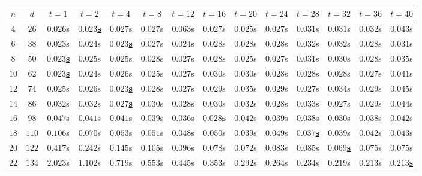 \begin{table}
    \centering
    {\renewcommand{\arraystretch}{1.15}
        \setlength{\tabcolsep}{2.5pt}
        \begin{tabular}{cccccccccccccc}
            $n$ & $d$ & $t = 1$ & $t = 2$ & $t = 4$ & $t = 8$ & $t = 12$ & $t = 16$ & $t = 20$ & $t = 24$ & $t = 28$ & $t = 32$ & $t = 36$ & $t = 40$ \\
            \hline
            $4$ & $26$ & $0.026$s & \underline{$\mathbf{0.023}$\textbf{s}} & $0.027$s & $0.027$s & $0.063$s & $0.027$s & $0.025$s & $0.027$s & $0.031$s & $0.031$s & $0.032$s & $0.043$s \\
            $6$ & $38$ & $0.023$s & $0.024$s & \underline{$\mathbf{0.023}$\textbf{s}} & $0.027$s & $0.024$s & $0.028$s & $0.028$s & $0.028$s & $0.032$s & $0.032$s & $0.028$s & $0.031$s \\
            $8$ & $50$ & \underline{$\mathbf{0.023}$\textbf{s}} & $0.025$s & $0.025$s & $0.028$s & $0.027$s & $0.028$s & $0.025$s & $0.027$s & $0.031$s & $0.030$s & $0.028$s & $0.035$s \\
            $10$ & $62$ & \underline{$\mathbf{0.023}$\textbf{s}} & $0.024$s & $0.026$s & $0.025$s & $0.027$s & $0.030$s & $0.030$s & $0.028$s & $0.028$s & $0.028$s & $0.027$s & $0.041$s \\
            $12$ & $74$ & $0.025$s & $0.026$s & \underline{$\mathbf{0.023}$\textbf{s}} & $0.028$s & $0.027$s & $0.029$s & $0.035$s & $0.029$s & $0.027$s & $0.034$s & $0.029$s & $0.045$s \\
            $14$ & $86$ & $0.032$s & $0.032$s & \underline{$\mathbf{0.027}$\textbf{s}} & $0.030$s & $0.028$s & $0.030$s & $0.032$s & $0.028$s & $0.033$s & $0.027$s & $0.029$s & $0.044$s \\
            $16$ & $98$ & $0.047$s & $0.041$s & $0.041$s & $0.039$s & $0.036$s & \underline{$\mathbf{0.028}$\textbf{s}} & $0.042$s & $0.039$s & $0.038$s & $0.030$s & $0.038$s & $0.042$s \\
            $18$ & $110$ & $0.106$s & $0.070$s & $0.053$s & $0.051$s & $0.048$s & $0.050$s & $0.039$s & $0.049$s & \underline{$\mathbf{0.037}$\textbf{s}} & $0.039$s & $0.042$s & $0.043$s \\
            $20$ & $122$ & $0.417$s & $0.242$s & $0.145$s & $0.105$s & $0.096$s & $0.078$s & $0.072$s & $0.083$s & $0.085$s & \underline{$\mathbf{0.069}$\textbf{s}} & $0.075$s & $0.075$s \\
            $22$ & $134$ & $2.023$s & $1.102$s & $0.719$s & $0.553$s & $0.445$s & $0.353$s & $0.292$s & $0.264$s & $0.234$s & $0.219$s & $0.213$s & \underline{$\mathbf{0.213}$\textbf{s}} \\

\end{tabular}}
\end{table}
